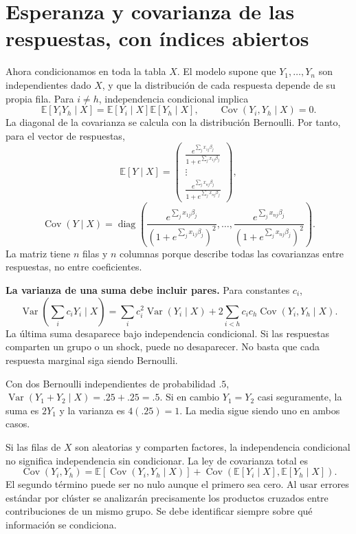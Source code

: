 \documentclass[11pt,a4paper]{article}
\newcommand{\E}{\mathbb E}
\DeclareMathOperator{\Var}{Var}
\DeclareMathOperator{\Cov}{Cov}
\DeclareMathOperator{\diag}{diag}
\begin{document}
\clearpage
\section{Esperanza y covarianza de las respuestas, con índices abiertos}\label{logit11}
Ahora condicionamos en toda la tabla $X$.
El modelo supone que $Y_1,\ldots,Y_n$ son independientes dado $X$,
y que la distribución de cada respuesta depende de su propia fila.
Para $i\ne h$, independencia condicional implica
\[
\E[Y_iY_h\mid X]=\E[Y_i\mid X]\E[Y_h\mid X],
\qquad \Cov(Y_i,Y_h\mid X)=0.
\]
La diagonal de la covarianza se calcula con la distribución Bernoulli.
Por tanto, para el vector de respuestas,
\[
\E[Y\mid X]=
\begin{pmatrix}
\frac{e^{\sum_jx_{1j}\beta_j}}{1+e^{\sum_jx_{1j}\beta_j}}\\
\vdots\\
\frac{e^{\sum_jx_{nj}\beta_j}}{1+e^{\sum_jx_{nj}\beta_j}}
\end{pmatrix},
\]
\[
\Cov(Y\mid X)=
\diag\left(
\frac{e^{\sum_jx_{1j}\beta_j}}{(1+e^{\sum_jx_{1j}\beta_j})^2},
\ldots,
\frac{e^{\sum_jx_{nj}\beta_j}}{(1+e^{\sum_jx_{nj}\beta_j})^2}
\right).
\]
La matriz tiene $n$ filas y $n$ columnas porque describe todas las
covarianzas entre respuestas, no entre coeficientes.

\textbf{La varianza de una suma debe incluir pares.}
Para constantes $c_i$,
\[
\Var\!\left(\sum_i c_iY_i\mid X\right)
=\sum_i c_i^2\Var(Y_i\mid X)
+2\sum_{i<h}c_ic_h\Cov(Y_i,Y_h\mid X).
\]
La última suma desaparece bajo independencia condicional.
Si las respuestas comparten un grupo o un shock, puede no desaparecer.
No basta que cada respuesta marginal siga siendo Bernoulli.

\begin{ejemplo}
Con dos Bernoulli independientes de probabilidad $.5$,
$\Var(Y_1+Y_2\mid X)=.25+.25=.5$.
Si en cambio $Y_1=Y_2$ casi seguramente,
la suma es $2Y_1$ y la varianza es $4(.25)=1$.
La media sigue siendo uno en ambos casos.
\end{ejemplo}
Si las filas de $X$ son aleatorias y comparten factores, la
independencia condicional no significa independencia sin condicionar.
La ley de covarianza total es
\[
\Cov(Y_i,Y_h)=\E[\Cov(Y_i,Y_h\mid X)]
+\Cov(\E[Y_i\mid X],\E[Y_h\mid X]).
\]
El segundo término puede ser no nulo aunque el primero sea cero.
Al usar errores estándar por clúster se analizarán precisamente
los productos cruzados entre contribuciones de un mismo grupo.
Se debe identificar siempre sobre qué información se condiciona.
\end{document}
